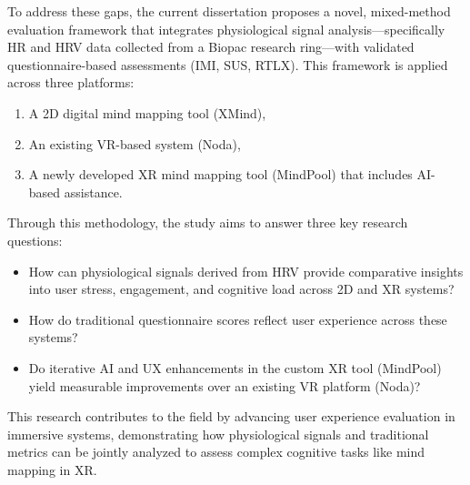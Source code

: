 \documentclass{CPP}
\begin{document}
To address these gaps, the current dissertation proposes a novel, mixed-method evaluation framework that integrates physiological signal analysis—specifically HR and HRV data collected from a Biopac research ring—with validated questionnaire-based assessments (IMI, SUS, RTLX). This framework is applied across three platforms:
\begin{enumerate}
    \item A 2D digital mind mapping tool (XMind),
    \item An existing VR-based system (Noda),
    \item A newly developed XR mind mapping tool (MindPool) that includes AI-based assistance.
\end{enumerate}

Through this methodology, the study aims to answer three key research questions:
\begin{itemize}
    \item How can physiological signals derived from HRV provide comparative insights into user stress, engagement, and cognitive load across 2D and XR systems?
    \item How do traditional questionnaire scores reflect user experience across these systems?
    \item Do iterative AI and UX enhancements in the custom XR tool (MindPool) yield measurable improvements over an existing VR platform (Noda)?
\end{itemize}

This research contributes to the field by advancing user experience evaluation in immersive systems, demonstrating how physiological signals and traditional metrics can be jointly analyzed to assess complex cognitive tasks like mind mapping in XR.







\end{document}
